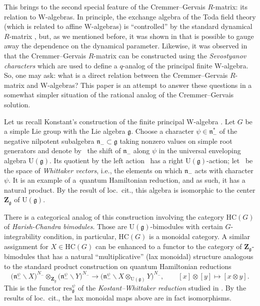 \documentclass[10pt,a4paper]{amsart}
\numberwithin{equation}{section}
\newcommand{\Z}{\mathbf{Z}}
\newcommand{\g}{\mathfrak{g}}
\newcommand{\n}{\mathfrak{n}}
\newcommand{\res}{\mathrm{res}}
\begin{document}
	This brings to the second special feature of the Cremmer--Gervais $R$-matrix: its relation to W-algebras. In principle, the exchange algebra of the Toda field theory (which is related to affine W-algebras) is ``controlled'' by the standard dynamical $R$-matrix \cite{GervaisNeveu}, but, as we mentioned before, it was shown in \cite{CremmerGervais} that is possible to gauge away the dependence on the dynamical parameter. Likewise, it was observed in \cite{BuffenoirRocheTerrasAffine} that the Cremmer--Gervais $R$-matrix can be constructed using the \emph{Sevostyanov characters} \cite{SevostyanovWhittakerModules} which are used to define a $q$-analog of the principal finite W-algebra. So, one may ask: what is a direct relation between the Cremmer--Gervais $R$-matrix and W-algebras? This paper is an attempt to answer these questions in a somewhat simpler situation of the rational analog of the Cremmer--Gervais solution.
	
	Let us recall Konstant's construction of the finite principal W-algebra \cite{Kostant}. Let $G$ be a simple Lie group with the Lie algebra $\g$. Choose a character $\psi \in \n_-^*$ of the negative nilpotent subalgebra $ \n_- \subset \g $ taking nonzero values on simple root generators and denote by~\smash{$\n_-^{\psi} = \{x - \psi(x) \mid x\in \n_-\}$} the shift of $\n_-$ along $\psi$ in the universal enveloping algebra $\mathrm{U}(\g)$. Its quotient by the left action~\smash{$\n_-^{\psi} \backslash \mathrm{U}(\g)$} has a right $\mathrm{U}(\g)$-action; let~\smash{$\bigl(\n_-^{\psi} \backslash \mathrm{U}(\g)\bigr)^{N_-}$} be the space of \emph{Whittaker vectors}, i.e., the elements on which $\n_-$ acts with character $\psi$. It is an example of a~quantum Hamiltonian reduction, and as such, it has a natural product. By the result of loc.\ cit., this algebra is isomorphic to the center $\Z_{\g}$ of $\mathrm{U}(\g)$.
	
	There is a categorical analog of this construction involving the category $\mathrm{HC}(G)$ of \emph{Harish-Chandra bimodules}. Those are $\mathrm{U}(\g)$-bimodules with certain $G$-integrability condition, in particular, $\mathrm{HC}(G)$ is a monoidal category. A similar assignment \smash{$X \mapsto \bigl(\n_-^{\psi} \backslash X\bigr)^{N_-}$} for $X\in \mathrm{HC}(G)$ can be enhanced to a functor to the category of $\Z_{\g}$-bimodules that has a natural ``multiplicative'' (lax monoidal) structure analogous to the standard product construction on quantum Hamiltonian reductions
	\[
	\bigl(\n_-^{\psi} \backslash X\bigr)^{N_-} \otimes_{\Z_{g}} \bigl(\n_-^{\psi} \backslash Y\bigr)^{N_-} \rightarrow \bigl(\n_-^{\psi} \backslash X \otimes_{\mathrm{U}(\g)} Y\bigr)^{N_-}, \qquad [x] \otimes [y] \mapsto [x\otimes y].
	\]
	This is the functor $\res_{\g}^{\psi}$ of the \emph{Kostant--Whittaker reduction} studied in \cite{BezrukavnikovFinkelberg}. By the results of loc.\ cit., the lax monoidal maps above are in fact isomorphisms.
	
\end{document}
